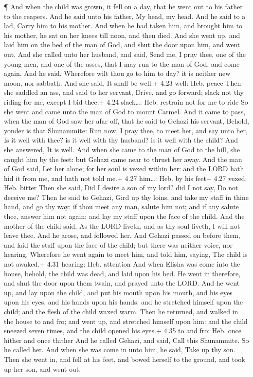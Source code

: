  ¶ And when the child was grown, it fell on a day, that he
went out to his father to the reapers.  And he said unto
his father, My head, my head. And he said to a lad, Carry him to his
mother.  And when he had taken him, and brought him to his
mother, he sat on her knees till noon, and then died.  And
she went up, and laid him on the bed of the man of God, and shut the
door upon him, and went out.  And she called unto her
husband, and said, Send me, I pray thee, one of the young men, and one
of the asses, that I may run to the man of God, and come again.
 And he said, Wherefore wilt thou go to him to day? it is
neither new moon, nor sabbath. And she said, It shall be well.+ 4.23
well: Heb. peace  Then she saddled an ass, and said to her
servant, Drive, and go forward; slack not thy riding for me, except I
bid thee.+ 4.24 slack\ldots: Heb. restrain not for me to ride
 So she went and came unto the man of God to mount Carmel.
And it came to pass, when the man of God saw her afar off, that he said
to Gehazi his servant, Behold, yonder is that Shunammite: 
Run now, I pray thee, to meet her, and say unto her, Is it well with
thee? is it well with thy husband? is it well with the child? And she
answered, It is well.  And when she came to the man of God
to the hill, she caught him by the feet: but Gehazi came near to thrust
her away. And the man of God said, Let her alone; for her soul is vexed
within her: and the LORD hath hid it from me, and hath not told me.+
4.27 him\ldots: Heb. by his feet+ 4.27 vexed: Heb. bitter 
Then she said, Did I desire a son of my lord? did I not say, Do not
deceive me?  Then he said to Gehazi, Gird up thy loins, and
take my staff in thine hand, and go thy way: if thou meet any man,
salute him not; and if any salute thee, answer him not again: and lay my
staff upon the face of the child.  And the mother of the
child said, As the LORD liveth, and as thy soul liveth, I will not leave
thee. And he arose, and followed her.  And Gehazi passed on
before them, and laid the staff upon the face of the child; but there
was neither voice, nor hearing. Wherefore he went again to meet him, and
told him, saying, The child is not awaked.+ 4.31 hearing: Heb. attention
 And when Elisha was come into the house, behold, the child
was dead, and laid upon his bed.  He went in therefore, and
shut the door upon them twain, and prayed unto the LORD. 
And he went up, and lay upon the child, and put his mouth upon his
mouth, and his eyes upon his eyes, and his hands upon his hands: and he
stretched himself upon the child; and the flesh of the child waxed warm.
 Then he returned, and walked in the house to and fro; and
went up, and stretched himself upon him: and the child sneezed seven
times, and the child opened his eyes.+ 4.35 to and fro: Heb. once hither
and once thither  And he called Gehazi, and said, Call this
Shunammite. So he called her. And when she was come in unto him, he
said, Take up thy son.  Then she went in, and fell at his
feet, and bowed herself to the ground, and took up her son, and went
out.

